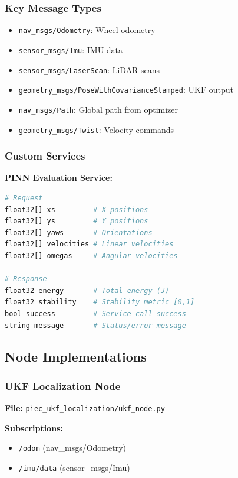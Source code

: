 \subsubsection{Key Message Types}

\begin{itemize}
    \item \texttt{nav\_msgs/Odometry}: Wheel odometry
    \item \texttt{sensor\_msgs/Imu}: IMU data
    \item \texttt{sensor\_msgs/LaserScan}: LiDAR scans
    \item \texttt{geometry\_msgs/PoseWithCovarianceStamped}: UKF output
    \item \texttt{nav\_msgs/Path}: Global path from optimizer
    \item \texttt{geometry\_msgs/Twist}: Velocity commands
\end{itemize}

\subsubsection{Custom Services}

\textbf{PINN Evaluation Service:}
\begin{lstlisting}[language=bash, caption=Service definition: EvaluateTrajectory.srv]
# Request
float32[] xs         # X positions
float32[] ys         # Y positions
float32[] yaws       # Orientations
float32[] velocities # Linear velocities
float32[] omegas     # Angular velocities
---
# Response
float32 energy       # Total energy (J)
float32 stability    # Stability metric [0,1]
bool success         # Service call success
string message       # Status/error message
\end{lstlisting}

\subsection{Node Implementations}

\subsubsection{UKF Localization Node}

\textbf{File:} \texttt{piec\_ukf\_localization/ukf\_node.py}

\textbf{Subscriptions:}
\begin{itemize}
    \item \texttt{/odom} (nav\_msgs/Odometry)
    \item \texttt{/imu/data} (sensor\_msgs/Imu)
\end{itemize}

